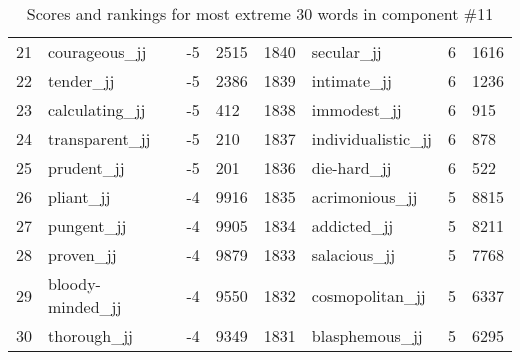 \begin{table}[tbp]
\begin{tabular}{| rlr@{.}l | rlr@{.}l |}
    21 & courageous\_jj & -5 & 2515    &    1840 & secular\_jj & 6 & 1616 \\
    22 & tender\_jj & -5 & 2386    &    1839 & intimate\_jj & 6 & 1236 \\
    23 & calculating\_jj & -5 & 412    &    1838 & immodest\_jj & 6 & 915 \\
    24 & transparent\_jj & -5 & 210    &    1837 & individualistic\_jj & 6 & 878 \\
    25 & prudent\_jj & -5 & 201    &    1836 & die-hard\_jj & 6 & 522 \\
    26 & pliant\_jj & -4 & 9916    &    1835 & acrimonious\_jj & 5 & 8815 \\
    27 & pungent\_jj & -4 & 9905    &    1834 & addicted\_jj & 5 & 8211 \\
    28 & proven\_jj & -4 & 9879    &    1833 & salacious\_jj & 5 & 7768 \\
    29 & bloody-minded\_jj & -4 & 9550    &    1832 & cosmopolitan\_jj & 5 & 6337 \\
    30 & thorough\_jj & -4 & 9349    &    1831 & blasphemous\_jj & 5 & 6295 \\
    \hline
    \end{tabular}
    \caption{Scores and rankings for most extreme 30 words in component \#11} 
\end{table}
\clearpage
